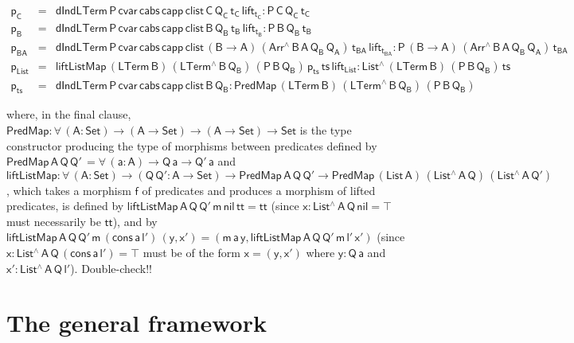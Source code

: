 \documentclass[9pt]{entcs}
\begin{document}
\vspace*{-0.2in}

\[\begin{array}{lll}
\mathsf{p_C} & = & \mathsf{dIndLTerm\,P\,cvar\,cabs \,capp \,clist\,
  C\, Q_C\, t_C\, lift_{t_C} : P \, C\, Q_C \, t_C }\\
\mathsf{p_B} & = & \mathsf{dIndLTerm\,P\,cvar\,cabs \,capp \,clist\,
  B\, Q_B\, t_B\, lift_{t_B} : P \, B\, Q_B \, t_B }\\
\mathsf{p_{BA}} & = & \mathsf{dIndLTerm\,P\,cvar\,cabs \,capp
  \,clist\, (B \to A)\,(Arr^{\wedge} \, B\, A\, Q_B \, Q_A) \,
  t_{BA}\, lift_{t_{BA}} : P \, (B \to A)\, (Arr^{\wedge} \, B\, A\,
  Q_B \, Q_A) \, t_{BA}}\\ 
\mathsf{p_{List}} & = &\mathsf{liftListMap \, (LTerm\, B) \,
  (LTerm^{\wedge} \, B \, Q_B)\, (P\,B\,Q_B)\, p_{ts} \, ts\,
  lift_{List} : List^{\wedge}\, (LTerm\,B) \, (P\,B\,Q_B) \, ts}\\
\mathsf{p_{ts}} & = & \mathsf{dIndLTerm\, P\, cvar\, cabs\, capp\,
  clist\, B\, Q_B : PredMap\,(LTerm\,B) \,(LTerm^{\wedge}\, B\, Q_B)
  \, (P\,B\,Q_B)}
\end{array}\]

\vspace*{-0.2in}

\noindent
where, in the final clause, $\mathsf{PredMap : \forall\, (A : Set) \to
  (A \to Set) \to (A \to Set) \to Set }$ is the type constructor
producing the type of morphisms between predicates defined by
$\mathsf{PredMap \,A\, Q\,Q'\, = \forall\, (a : A) \to Q\,a \to
  Q'\,a}$ and $\mathsf{liftListMap : \forall\, (A : Set) \to (Q \, Q'
  : A \to Set) \to PredMap\,A\,Q\,Q' \to PredMap\,(List\,A)
  \,(List^{\wedge}\, A\, Q)\, (List^{\wedge}\, A\, Q')}$, which takes
a morphism $\mathsf{f}$ of predicates and produces a morphism of
lifted predicates, is defined by $\mathsf{liftListMap\, A\, Q\, Q'\,
  m\, nil\, tt = tt}$ (since $\mathsf{x : List^{\wedge}\, A\, Q\, nil
  = \top}$ must necessarily be $\mathsf{tt}$), and by
$\mathsf{liftListMap\, A\, Q\, Q'\, m\, (cons\, a\, l')\, (y, x') =
  (m\,a\,y, liftListMap\, A\, Q\, Q'\, m\, l'\, x')}$ (since $\mathsf{x
  : List^{\wedge}\, A\, Q\, (cons\, a\, l') = \top}$ must be of the
form $\mathsf{x = (y, x')}$ where $\mathsf{y : Q\,a}$ and $\mathsf{x'
  : List^{\wedge}\, A\, Q\, l'}$). {\color{red} Double-check!!}

\section{The general framework}\label{sec:framework}
\end{document}
